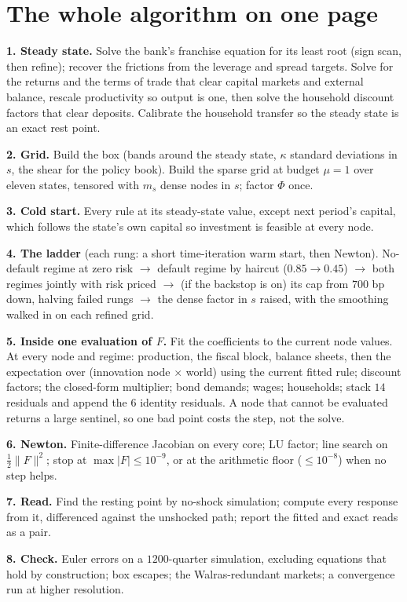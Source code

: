 \documentclass[10pt,a4paper]{article}
\theoremstyle{plain}
\theoremstyle{remark}
\begin{document}
\section{The whole algorithm on one page}

\begin{framed}\small
\noindent\textbf{1. Steady state.} Solve the bank's franchise equation for its least root (sign scan,
then refine); recover the frictions from the leverage and spread targets. Solve for the returns and
the terms of trade that clear capital markets and external balance, rescale productivity so output is
one, then solve the household discount factors that clear deposits. Calibrate the household transfer
so the steady state is an exact rest point.

\smallskip\noindent\textbf{2. Grid.} Build the box (bands around the steady state, $\kappa$ standard
deviations in $s$, the shear for the policy book). Build the sparse grid at budget $\mu=1$ over eleven
states, tensored with $m_s$ dense nodes in $s$; factor $\Phi$ once.

\smallskip\noindent\textbf{3. Cold start.} Every rule at its steady-state value, except next period's
capital, which follows the state's own capital so investment is feasible at every node.

\smallskip\noindent\textbf{4. The ladder} (each rung: a short time-iteration warm start, then Newton).
No-default regime at zero risk $\to$ default regime by haircut ($0.85\to0.45$) $\to$ both regimes
jointly with risk priced $\to$ (if the backstop is on) its cap from $700$ bp down, halving failed
rungs $\to$ the dense factor in $s$ raised, with the smoothing walked in on each refined grid.

\smallskip\noindent\textbf{5. Inside one evaluation of $F$.} Fit the coefficients to the current node
values. At every node and regime: production, the fiscal block, balance sheets, then the expectation
over (innovation node $\times$ world) using the current fitted rule; discount factors; the closed-form
multiplier; bond demands; wages; households; stack $14$ residuals and append the $6$ identity
residuals. A node that cannot be evaluated returns a large sentinel, so one bad point costs the step,
not the solve.

\smallskip\noindent\textbf{6. Newton.} Finite-difference Jacobian on every core; LU factor; line search
on $\tfrac12\|F\|^2$; stop at $\max|F|\le10^{-9}$, or at the arithmetic floor ($\le10^{-8}$) when no
step helps.

\smallskip\noindent\textbf{7. Read.} Find the resting point by no-shock simulation; compute every
response from it, differenced against the unshocked path; report the fitted and exact reads as a pair.

\smallskip\noindent\textbf{8. Check.} Euler errors on a $1200$-quarter simulation, excluding equations
that hold by construction; box escapes; the Walras-redundant markets; a convergence run at higher
resolution.
\end{framed}
\end{document}
